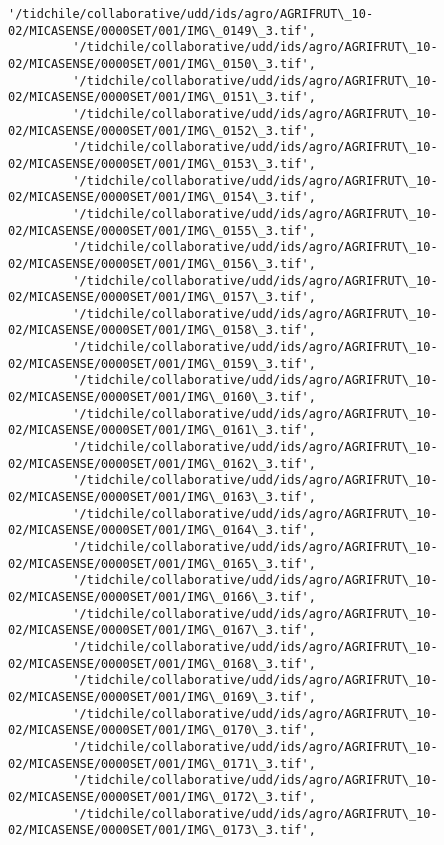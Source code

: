 \documentclass[11pt]{article}
\begin{document}
\begin{Verbatim}[commandchars=\\\{\}]
         '/tidchile/collaborative/udd/ids/agro/AGRIFRUT\_10-02/MICASENSE/0000SET/001/IMG\_0149\_3.tif',
         '/tidchile/collaborative/udd/ids/agro/AGRIFRUT\_10-02/MICASENSE/0000SET/001/IMG\_0150\_3.tif',
         '/tidchile/collaborative/udd/ids/agro/AGRIFRUT\_10-02/MICASENSE/0000SET/001/IMG\_0151\_3.tif',
         '/tidchile/collaborative/udd/ids/agro/AGRIFRUT\_10-02/MICASENSE/0000SET/001/IMG\_0152\_3.tif',
         '/tidchile/collaborative/udd/ids/agro/AGRIFRUT\_10-02/MICASENSE/0000SET/001/IMG\_0153\_3.tif',
         '/tidchile/collaborative/udd/ids/agro/AGRIFRUT\_10-02/MICASENSE/0000SET/001/IMG\_0154\_3.tif',
         '/tidchile/collaborative/udd/ids/agro/AGRIFRUT\_10-02/MICASENSE/0000SET/001/IMG\_0155\_3.tif',
         '/tidchile/collaborative/udd/ids/agro/AGRIFRUT\_10-02/MICASENSE/0000SET/001/IMG\_0156\_3.tif',
         '/tidchile/collaborative/udd/ids/agro/AGRIFRUT\_10-02/MICASENSE/0000SET/001/IMG\_0157\_3.tif',
         '/tidchile/collaborative/udd/ids/agro/AGRIFRUT\_10-02/MICASENSE/0000SET/001/IMG\_0158\_3.tif',
         '/tidchile/collaborative/udd/ids/agro/AGRIFRUT\_10-02/MICASENSE/0000SET/001/IMG\_0159\_3.tif',
         '/tidchile/collaborative/udd/ids/agro/AGRIFRUT\_10-02/MICASENSE/0000SET/001/IMG\_0160\_3.tif',
         '/tidchile/collaborative/udd/ids/agro/AGRIFRUT\_10-02/MICASENSE/0000SET/001/IMG\_0161\_3.tif',
         '/tidchile/collaborative/udd/ids/agro/AGRIFRUT\_10-02/MICASENSE/0000SET/001/IMG\_0162\_3.tif',
         '/tidchile/collaborative/udd/ids/agro/AGRIFRUT\_10-02/MICASENSE/0000SET/001/IMG\_0163\_3.tif',
         '/tidchile/collaborative/udd/ids/agro/AGRIFRUT\_10-02/MICASENSE/0000SET/001/IMG\_0164\_3.tif',
         '/tidchile/collaborative/udd/ids/agro/AGRIFRUT\_10-02/MICASENSE/0000SET/001/IMG\_0165\_3.tif',
         '/tidchile/collaborative/udd/ids/agro/AGRIFRUT\_10-02/MICASENSE/0000SET/001/IMG\_0166\_3.tif',
         '/tidchile/collaborative/udd/ids/agro/AGRIFRUT\_10-02/MICASENSE/0000SET/001/IMG\_0167\_3.tif',
         '/tidchile/collaborative/udd/ids/agro/AGRIFRUT\_10-02/MICASENSE/0000SET/001/IMG\_0168\_3.tif',
         '/tidchile/collaborative/udd/ids/agro/AGRIFRUT\_10-02/MICASENSE/0000SET/001/IMG\_0169\_3.tif',
         '/tidchile/collaborative/udd/ids/agro/AGRIFRUT\_10-02/MICASENSE/0000SET/001/IMG\_0170\_3.tif',
         '/tidchile/collaborative/udd/ids/agro/AGRIFRUT\_10-02/MICASENSE/0000SET/001/IMG\_0171\_3.tif',
         '/tidchile/collaborative/udd/ids/agro/AGRIFRUT\_10-02/MICASENSE/0000SET/001/IMG\_0172\_3.tif',
         '/tidchile/collaborative/udd/ids/agro/AGRIFRUT\_10-02/MICASENSE/0000SET/001/IMG\_0173\_3.tif',

\end{Verbatim}
\end{document}
